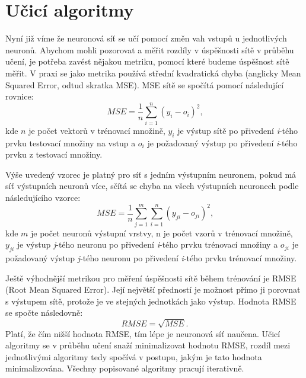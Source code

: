 \documentclass[11pt,twoside,a4paper]{book}
\begin{document}
\section{Učicí algoritmy}
Nyní již víme že neuronová síť se učí pomocí změn vah vstupů u jednotlivých neuronů. Abychom mohli pozorovat a měřit rozdíly v úspěšnosti sítě v průběhu učení, je potřeba zavést nějakou metriku, pomocí které budeme úspěšnost sítě měřit. V praxi se jako metrika používá střední kvadratická chyba (anglicky Mean Squared Error, odtud skratka MSE). MSE sítě se spočítá pomocí následující rovnice:
\begin{equation}
	MSE=\frac{1}{n}\sum\limits_{i=1}^n (y_{i}-o_{i})^{2}\mbox{,}
\end{equation}
 kde \begin{math}n\end{math} je počet vektorů v trénovací množině,  \begin{math}y_{i}\end{math} je výstup sítě po přivedení \textit{i}-tého prvku testovací množiny na vstup a \begin{math}o_{i}\end{math} je požadovaný výstup po přivedení \textit{i}-tého prvku z testovací množiny.

Výše uvedený vzorec je platný pro síť s jedním výstupním neuronem, pokud má síť výstupních neuronů více, sčítá se chyba na všech výstupních neuronech podle následujícího vzorce:
\begin{equation}
	MSE=\frac{1}{n}\sum\limits_{j=1}^m\sum\limits_{i=1}^n (y_{ji}-o_{ji})^{2}\mbox{,} 
\end{equation}
kde \begin{math}m\end{math} je počet neuronů výstupní vrstvy, n je počet vzorů v trénovací množině, \begin{math}y_{ji}\end{math} je výstup \textit{j}-tého neuronu po přivedení \textit{i}-tého prvku trénovací množiny a \begin{math}o_{ji}\end{math} je požadovaný výstup \textit{j}-tého neuronu po přivedení \textit{i}-tého prvku trénovací množiny.

Ještě výhodnější metrikou pro měření úspěšnosti sítě během trénování je RMSE (Root Mean Squared Error). Její největší předností je možnost přímo ji porovnat s výstupem sítě, protože je ve stejných jednotkách jako výstup. Hodnota RMSE se spočte následovně:
\begin{equation}
RMSE=\sqrt{MSE}\mbox{.}
\end{equation}
Platí, že čím nižší hodnota RMSE, tím lépe je neuronová síť naučena. Učicí algoritmy se v průběhu učení snaží minimalizovat hodnotu RMSE, rozdíl mezi jednotlivými algoritmy tedy spočívá v postupu, jakým je tato hodnota minimalizována. Všechny popisované algoritmy pracují iterativně.
\end{document}
